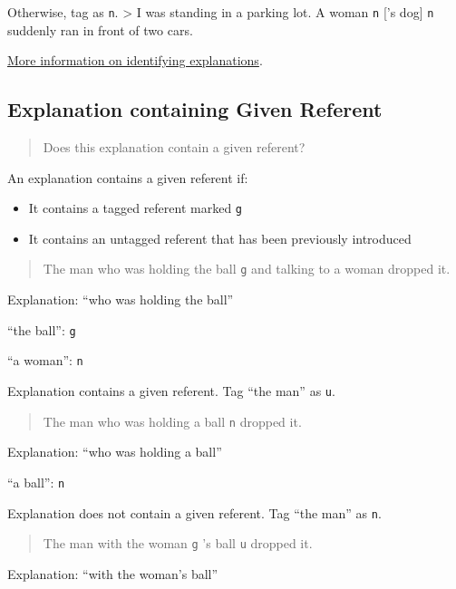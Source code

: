 \documentclass[
]{book}
\providecommand{\tightlist}{%
  \setlength{\itemsep}{0pt}\setlength{\parskip}{0pt}}
\begin{document}
Otherwise, tag as \texttt{n}.
\textgreater{} I was standing in a parking lot. A woman \texttt{n} {[}'s dog{]} \texttt{n} suddenly ran in front of two cars.

\protect\hyperlink{referent-explanations}{More information on identifying explanations}.

\hypertarget{explanation-containing-given-referent}{%
\subsection{Explanation containing Given Referent}\label{explanation-containing-given-referent}}

\begin{quote}
Does this explanation contain a given referent?
\end{quote}

An explanation contains a given referent if:

\begin{itemize}
\tightlist
\item
  It contains a tagged referent marked \texttt{g}
\item
  It contains an untagged referent that has been previously introduced
\end{itemize}

\begin{quote}
The man who was holding the ball \texttt{g} and talking to a woman dropped it.
\end{quote}

Explanation: ``who was holding the ball''

``the ball'': \texttt{g}

``a woman'': \texttt{n}

Explanation contains a given referent.
Tag ``the man'' as \texttt{u}.

\begin{quote}
The man who was holding a ball \texttt{n} dropped it.
\end{quote}

Explanation: ``who was holding a ball''

``a ball'': \texttt{n}

Explanation does not contain a given referent.
Tag ``the man'' as \texttt{n}.

\begin{quote}
The man with the woman \texttt{g} 's ball \texttt{u} dropped it.
\end{quote}

Explanation: ``with the woman's ball''
\end{document}
